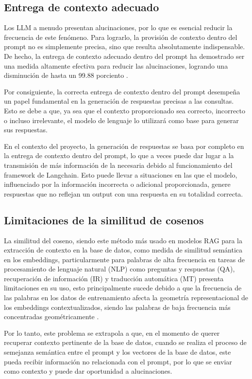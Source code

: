 \subsection{Entrega de contexto adecuado}

Los LLM a menudo presentan alucinaciones, por lo que es esencial reducir la frecuencia de este fenómeno. 
Para lograrlo, la provisión de contexto dentro del prompt no es simplemente precisa, sino que resulta 
absolutamente indispensable. De hecho, la entrega de contexto adecuado dentro del prompt ha demostrado 
ser una medida altamente efectiva para reducir las alucinaciones, logrando una disminución de hasta un 
99.88 porciento \cite{riego1}.

Por consiguiente, la correcta entrega de contexto dentro del prompt desempeña un papel fundamental en 
la generación de respuestas precisas a las consultas. Esto se debe a que, ya sea que el contexto 
proporcionado sea correcto, incorrecto o incluso irrelevante, el modelo de lenguaje lo utilizará como base 
para generar sus respuestas.

En el contexto del proyecto, la generación de respuestas se basa por completo en la entrega de contexto 
dentro del prompt, lo que a veces puede dar lugar a la transmisión de más información de la necesaria 
debido al funcionamiento del framework de Langchain. Esto puede llevar a situaciones en las que el modelo, 
influenciado por la información incorrecta o adicional proporcionada, genere respuestas que no reflejan 
un output con una respuesta en su totalidad correcta.

\subsection{Limitaciones de la similitud de cosenos}

La similitud del coseno, siendo este método más usado en modelos RAG para la extracción de contexto en la base de datos, 
como medida de similitud semántica en los embeddings, particularmente para palabras de alta frecuencia en tareas de 
procesamiento de lenguaje natural (NLP) como preguntas y respuestas (QA), recuperación de información (IR) y traducción 
automática (MT) presenta limitaciones en su uso, esto principalmente sucede debido a que la frecuencia de las palabras en los 
datos de entrenamiento afecta la geometría representacional de los embeddings contextualizados, siendo las palabras de baja 
frecuencia más concentradas geométricamente \cite{coseno}.

Por lo tanto, este problema se extrapola a que, en el momento de querer recuperar contexto pertinente de la base de datos, 
cuando se realiza el proceso de semejanza semántica entre el prompt y los vectores de la base de datos, este pueda recibir 
información no relacionada con el prompt, por lo que se enviar como contexto y puede dar oportunidad a alucinaciones.


